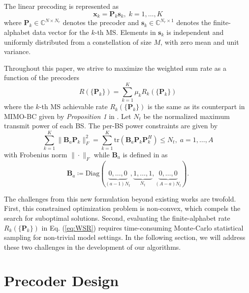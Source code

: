 \documentclass{article}
\begin{document}
The linear precoding is represented as
\begin{equation}
    \label{eq:precoder}
    \mathbf{x}_k = \mathbf{P}_k\mathbf{s}_k,\;k=1,\ldots,K
\end{equation}
where $\mathbf{P}_k\in\mathbb{C}^{N\times N_r}$ denotes the precoder and $\mathbf{s}_k\in\mathbb{C}^{N_r\times1}$
denotes the finite-alphabet data vector for the $k$-th MS. Elements in $\mathbf{s}_k$ is independent and uniformly
distributed from a
constellation of size $M$, with zero mean and unit variance.

Throughout this paper, we strive to maximize the weighted sum rate as a function of the precoders
\begin{equation}
    \label{eq:WSR}
    R(\{\mathbf{P}_k\}) = \sum_{k=1}^K\mu_kR_k(\{\mathbf{P}_k\})
\end{equation}
where the $k$-th MS achievable rate  $R_k(\{\mathbf{P}_k\})$   is the same as its counterpart in MIMO-BC given by \emph{Proposition 1} in \cite{wu2012linear}.
Let $N_t$ be the normalized maximum transmit power of each BS. The per-BS power constraints are given by
\begin{equation}
    \label{eq:perBSpwrConstr}
    \sum_{k=1}^K\|\mathbf{B}_a\mathbf{P}_k\|_F^2 = \sum_{k=1}^K\mbox{tr}\left(\mathbf{B}_a\mathbf{P}_k\mathbf{P}_k^H\right) \leq N_t,\;a=1,\ldots,A
\end{equation}
with Frobenius norm $\|\cdot\|_F$ while $\mathbf{B}_a$ is defined in \cite{zhang2010cooperative} as
\begin{equation}
    \label{eq:Ba}
    \mathbf{B}_a\coloneqq\mbox{Diag}(\underbrace{0,\ldots,0}_{(a-1)N_t},\underbrace{1,\ldots,1}_{N_t},\underbrace{0,\ldots,0}_{(A-a)N_t}).
\end{equation}

The challenges from this new formulation beyond existing works are twofold. First, this constrained optimization
problem is non-convex, which compels the search for suboptimal solutions. Second, evaluating the
finite-alphabet rate $R_k(\{\mathbf{P}_k\})$ in Eq. (\ref{eq:WSR}) requires time-consuming Monte-Carlo
statistical sampling for non-trivial model settings. In the following section, we will address these
two challenges in the development of our algorithms.  %


\vspace*{-4mm}

\section{Precoder Design}
\label{sec:pd}
\vspace*{-3mm}
\end{document}
